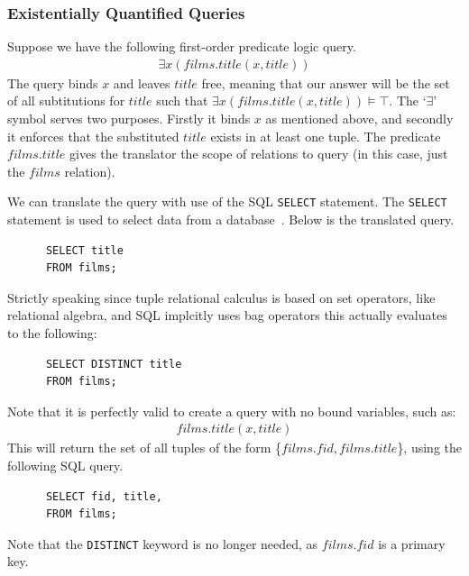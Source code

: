\documentclass[a4paper, 11pt]{article}
\begin{document}
    \subsubsection{Existentially Quantified Queries}
      Suppose we have the following first-order predicate logic query.
      \begin{gather}
        \exists x(films.title(x, title)) \label{select1}
      \end{gather}
      The query binds $x$ and leaves $title$ free, meaning that our
      answer will be the set of all subtitutions for $title$ such that
      $\exists x(films.title(x, title)) \models \top$. The `$\exists$' symbol
      serves two purposes. Firstly it binds $x$ as mentioned above, and secondly
      it enforces that the substituted $title$ exists in at least one tuple.
      The predicate $films.title$ gives the translator the scope of
      relations to query (in this case, just the $films$ relation).

      We can translate the query with use of the SQL \texttt{SELECT} statement.
      The \texttt{SELECT} statement is used to select data from a
      database~\cite{w3SELECT}. Below is the translated query.
      \begin{verbatim}
      SELECT title
      FROM films;
      \end{verbatim}
      Strictly speaking since tuple relational calculus is based on set
      operators, like relational algebra, and SQL implcitly uses bag operators
      this actually evaluates to the following:
      \begin{verbatim}
      SELECT DISTINCT title
      FROM films;
      \end{verbatim}
      Note that it is perfectly valid to create a query with no bound variables,
      such as:
      \begin{gather}
        films.title(x, title) \label{select2}
      \end{gather}
      This will return the set of all tuples of the form \{$films.fid,
      films.title$\}, using the following SQL query.
      \begin{verbatim}
      SELECT fid, title,
      FROM films;
      \end{verbatim}
      Note that the \texttt{DISTINCT} keyword is no longer needed, as $films.fid$
      is a primary key.
\end{document}
